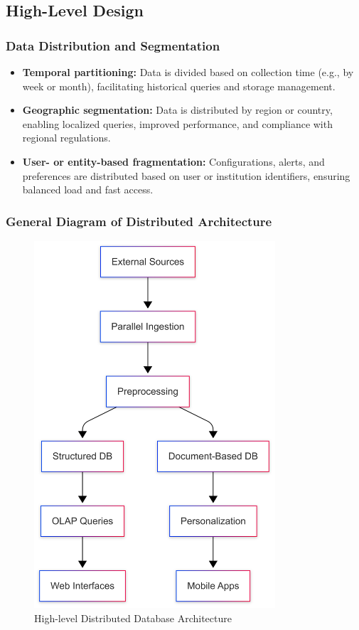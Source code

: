 \subsection{High-Level Design}

\subsubsection{Data Distribution and Segmentation}

\begin{itemize}[leftmargin=1.5em]
  \item \textbf{Temporal partitioning:} Data is divided based on collection time (e.g., by week or month), facilitating historical queries and storage management.
  \item \textbf{Geographic segmentation:} Data is distributed by region or country, enabling localized queries, improved performance, and compliance with regional regulations.
  \item \textbf{User- or entity-based fragmentation:} Configurations, alerts, and preferences are distributed based on user or institution identifiers, ensuring balanced load and fast access.
\end{itemize}

\subsubsection{General Diagram of Distributed Architecture}

\begin{figure}[H]
  \centering
  \includegraphics[width=0.8\textwidth]{Imagenes/distributed.png}
  \caption{High-level Distributed Database Architecture}
\end{figure}


